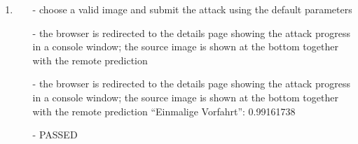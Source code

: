 \begin{description}
\begin{enumerate}
\begin{itemize}
		\end{itemize}
		\item  
		\begin{itemize}
			\item [-] choose a valid image and submit the attack using the default parameters
			\item [-] the browser is redirected to the details page showing the attack progress in a console window; the source image is shown at the bottom together with the remote prediction
			\item [-] the browser is redirected to the details page showing the attack progress in a console window; the source image is shown at the bottom together with the remote prediction \enquote{Einmalige Vorfahrt}: 0.99161738
			\item [-] PASSED
		\end{itemize}
	\end{enumerate}
\end{description}